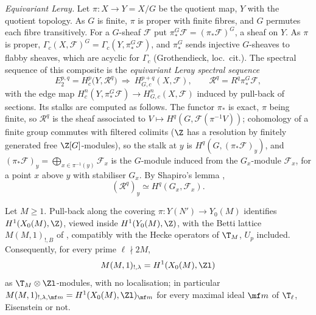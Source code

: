\emph{Equivariant Leray.} Let $\pi\colon X\to Y=X/G$ be the quotient map, $Y$ with the quotient topology. As $G$ is finite, $\pi$ is proper with finite fibres, and $G$ permutes each fibre transitively.
For a $G$-sheaf $\mathcal F$ put $\pi^G_*\mathcal F=(\pi_*\mathcal F)^G$, a sheaf on $Y$. As $\pi$ is proper, $\Gamma_c(X,\mathcal F)^G=\Gamma_c(Y,\pi^G_*\mathcal F)$, and $\pi^G_*$ sends injective $G$-sheaves to flabby
sheaves, which are acyclic for $\Gamma_c$ (Grothendieck, loc.\ cit.). The spectral sequence of this composite is the \emph{equivariant Leray spectral sequence}
\[
E_2^{p,q}=H^p_c\bigl(Y,\mathcal R^q\bigr)\ \Longrightarrow\ H^{p+q}_{G,c}(X,\mathcal F),\qquad \mathcal R^q=R^q\pi^G_*\mathcal F,
\]
with the edge map $H^n_c(Y,\pi^G_*\mathcal F)\to H^n_{G,c}(X,\mathcal F)$ induced by pull-back of sections. Its stalks are computed as follows. The functor $\pi_*$ is exact, $\pi$ being finite, so
$\mathcal R^q$ is the sheaf associated to $V\mapsto H^q(G,\mathcal F(\pi^{-1}V))$; cohomology of a finite group commutes with filtered colimits ($\Z$ has a resolution by finitely generated free
$\Z[G]$-modules), so the stalk at $y$ is $H^q(G,(\pi_*\mathcal F)_y)$, and $(\pi_*\mathcal F)_y=\bigoplus_{x\in\pi^{-1}(y)}\mathcal F_x$ is the $G$-module induced from the $G_x$-module $\mathcal F_x$, for a point $x$ above $y$ with
stabiliser $G_x$. By Shapiro's lemma \cite[Chapter III, Section 6]{Brown},
\[
(\mathcal R^q)_y\simeq H^q(G_x,\mathcal F_x).
\]

\begin{proposition}\label{prop:congruence:integral-structure}
Let $M\ge1$. Pull-back along the covering $\pi\colon Y(N')\to Y_0(M)$ identifies $H^1(X_0(M),\Z)$, viewed inside $H^1(Y_0(M),\Z)$, with the Betti lattice $M(M,1)_{!,B}$
of , compatibly with the Hecke operators of $\T_M$, $U_p$ included. Consequently, for every prime $\ell\nmid2M$,
\[
M(M,1)_{!,\lambda}=H^1(X_0(M),\Zl)
\]
as $\T_M\otimes\Zl$-modules, with no localisation; in particular $M(M,1)_{!,\lambda,\mf m}=H^1(X_0(M),\Zl)_{\mf m}$ for every maximal ideal $\mf m$ of $\T_\ell$, Eisenstein or not.
\end{proposition}

